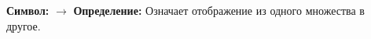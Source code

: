 
\hypertarget{def-to}{}
\begin{definition}[def-to]
\textbf{Символ:} $\to$
\textbf{Определение:} Означает отображение из одного множества в другое.
\end{definition}
